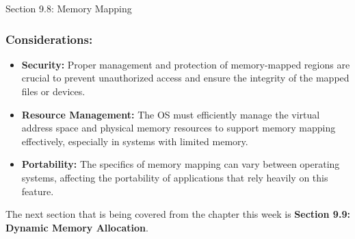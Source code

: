 \begin{notes}{Section 9.8: Memory Mapping}
    \subsubsection*{Considerations:}
    
    \begin{itemize}
        \item \textbf{Security:} Proper management and protection of memory-mapped regions are crucial to prevent unauthorized access and ensure the integrity of the mapped files or devices.
        \item \textbf{Resource Management:} The OS must efficiently manage the virtual address space and physical memory resources to support memory mapping effectively, especially in systems with limited memory.
        \item \textbf{Portability:} The specifics of memory mapping can vary between operating systems, affecting the portability of applications that rely heavily on this feature.
    \end{itemize}    
\end{notes}

The next section that is being covered from the chapter this week is \textbf{Section 9.9: Dynamic Memory Allocation}.

